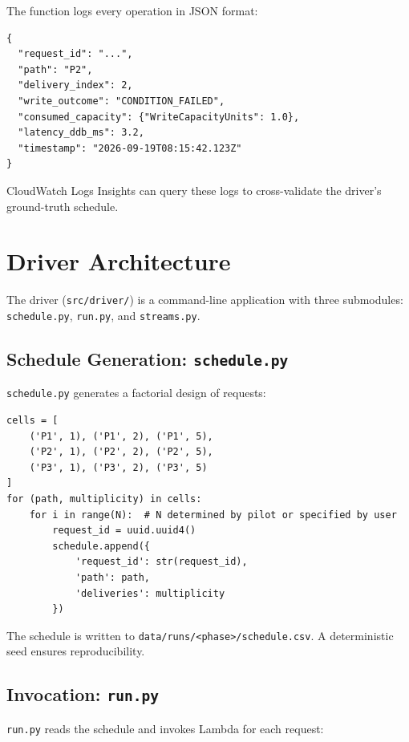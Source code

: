 The function logs every operation in JSON format:

\begin{verbatim}
{
  "request_id": "...",
  "path": "P2",
  "delivery_index": 2,
  "write_outcome": "CONDITION_FAILED",
  "consumed_capacity": {"WriteCapacityUnits": 1.0},
  "latency_ddb_ms": 3.2,
  "timestamp": "2026-09-19T08:15:42.123Z"
}
\end{verbatim}

CloudWatch Logs Insights can query these logs to cross-validate the driver's ground-truth schedule.

\section{Driver Architecture}

The driver (\texttt{src/driver/}) is a command-line application with three submodules: \texttt{schedule.py}, \texttt{run.py}, and \texttt{streams.py}.

\subsection{Schedule Generation: \texttt{schedule.py}}

\texttt{schedule.py} generates a factorial design of requests:

\begin{verbatim}
cells = [
    ('P1', 1), ('P1', 2), ('P1', 5),
    ('P2', 1), ('P2', 2), ('P2', 5),
    ('P3', 1), ('P3', 2), ('P3', 5)
]
for (path, multiplicity) in cells:
    for i in range(N):  # N determined by pilot or specified by user
        request_id = uuid.uuid4()
        schedule.append({
            'request_id': str(request_id),
            'path': path,
            'deliveries': multiplicity
        })
\end{verbatim}

The schedule is written to \texttt{data/runs/<phase>/schedule.csv}. A deterministic seed ensures reproducibility.

\subsection{Invocation: \texttt{run.py}}

\texttt{run.py} reads the schedule and invokes Lambda for each request:


